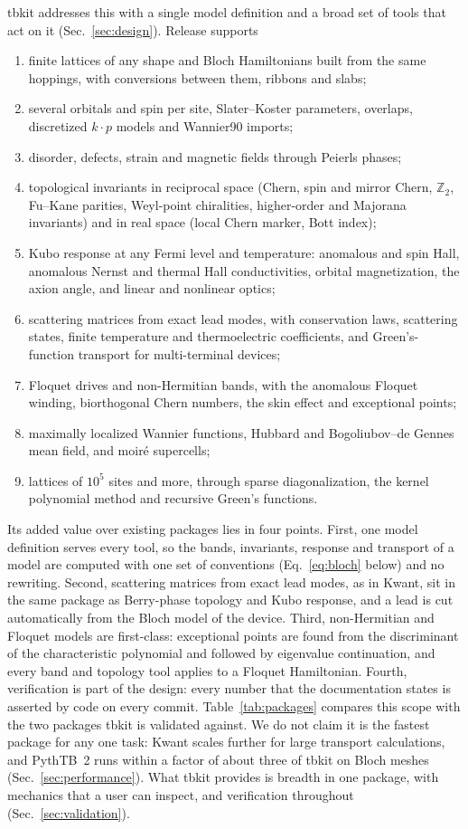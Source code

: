 \documentclass[submission, Phys]{SciPost}
\begin{document}
tbkit addresses this with a single model definition and a broad
set of tools that act on it (Sec.~\ref{sec:design}). Release
\tbkitversion{} supports
\begin{enumerate}
\item finite lattices of any shape and Bloch Hamiltonians built from the
  same hoppings, with conversions between them, ribbons and slabs;
\item several orbitals and spin per site, Slater--Koster parameters,
  overlaps, discretized $k\cdot p$ models and Wannier90 imports;
\item disorder, defects, strain and magnetic fields through Peierls phases;
\item topological invariants in reciprocal space (Chern, spin and mirror
  Chern, $\mathbb{Z}_2$, Fu--Kane parities, Weyl-point chiralities,
  higher-order and Majorana invariants) and in real space (local Chern
  marker, Bott index);
\item Kubo response at any Fermi level and temperature: anomalous and
  spin Hall, anomalous Nernst and thermal Hall conductivities, orbital
  magnetization, the axion angle, and linear and nonlinear optics;
\item scattering matrices from exact lead modes, with conservation laws,
  scattering states, finite temperature and thermoelectric coefficients,
  and Green's-function transport for multi-terminal devices;
\item Floquet drives and non-Hermitian bands, with the anomalous Floquet
  winding, biorthogonal Chern numbers, the skin effect and exceptional
  points;
\item maximally localized Wannier functions, Hubbard and
  Bogoliubov--de Gennes mean field, and moir\'e supercells;
\item lattices of $10^5$ sites and more, through sparse diagonalization,
  the kernel polynomial method and recursive Green's functions.
\end{enumerate}
Its added value over existing packages lies in four points. First, one
model definition serves every tool, so the bands, invariants, response
and transport of a model are computed with one set of conventions
(Eq.~\eqref{eq:bloch} below) and no rewriting. Second, scattering matrices
from exact lead modes, as in Kwant, sit in the same package as Berry-phase
topology and Kubo response, and a lead is cut automatically from the
Bloch model of the device. Third, non-Hermitian and Floquet models are
first-class: exceptional points are found from the discriminant of the
characteristic polynomial and followed by eigenvalue continuation, and
every band and topology tool applies to a Floquet Hamiltonian. Fourth,
verification is part of the design: every number that the documentation
states is asserted by code on every commit.
Table~\ref{tab:packages} compares this scope with the two packages tbkit
is validated against. We do not claim it is the fastest package for any
one task: Kwant scales further for large transport calculations, and
PythTB~2 runs within a factor of about three of tbkit on Bloch meshes
(Sec.~\ref{sec:performance}). What tbkit provides is breadth in one
package, with mechanics that a user can inspect, and verification
throughout (Sec.~\ref{sec:validation}).
\end{document}
